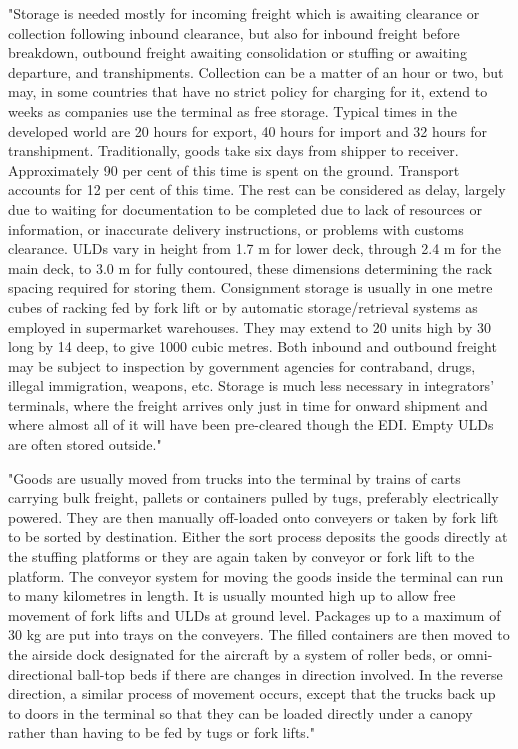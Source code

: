 "Storage is needed mostly for incoming freight which is awaiting clearance or collection following inbound clearance, but also for inbound freight before breakdown, outbound freight
awaiting consolidation or stuffing or awaiting departure, and transhipments. Collection can be a matter of an hour or two, but may, in some countries that have no strict policy for charging for it, extend to weeks as companies use the terminal as free storage. Typical times in the developed world are 20 hours for export, 40 hours for import and 32 hours for transhipment.
Traditionally, goods take six days from shipper to receiver. Approximately 90 per cent of this time is spent on the ground. Transport accounts for 12 per cent of this time. The rest can be
considered as delay, largely due to waiting for documentation to be completed due to lack of resources or information, or inaccurate delivery instructions, or problems with customs
clearance. ULDs vary in height from 1.7 m for lower deck, through 2.4 m for the main deck, to 3.0 m for fully contoured, these dimensions determining the rack spacing required for storing
them. Consignment storage is usually in one metre cubes of racking fed by fork lift or by automatic storage/retrieval systems as employed in supermarket warehouses. They may extend
to 20 units high by 30 long by 14 deep, to give 1000 cubic metres. Both inbound and outbound freight may be subject to inspection by government agencies for contraband, drugs, illegal
immigration, weapons, etc. Storage is much less necessary in integrators’ terminals, where the freight arrives only just in time for onward shipment and where almost all of it will have been pre-cleared though the EDI. Empty ULDs are often stored outside."


"Goods are usually moved from trucks into the terminal by trains of carts carrying bulk freight, pallets or containers pulled by tugs, preferably electrically powered. They are then manually off-loaded onto conveyers or taken by fork lift to be sorted by destination. Either the sort process deposits the goods directly at the stuffing platforms or they are again taken by conveyor or fork lift to the platform. The conveyor system for moving the goods inside the terminal can run to many kilometres in length. It is usually mounted high up to allow free movement of fork lifts and ULDs at ground level. Packages up to a maximum of 30 kg are put into trays on the conveyers. The filled containers are then moved to the airside dock designated for the aircraft by a system of roller beds, or omni-directional ball-top beds if there are changes in direction involved. In the reverse direction, a similar process of movement occurs, except that the trucks back up to doors in the terminal so that they can be loaded directly under a canopy rather than having to be fed by tugs or fork lifts."
